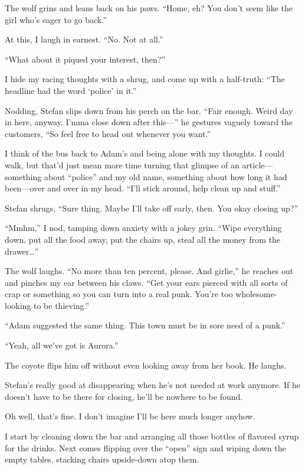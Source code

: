 The wolf grins and leans back on his paws. ``Home, eh? You don't seem like the girl who's eager to go back.''

At this, I laugh in earnest. ``No. Not at all.''

``What about it piqued your interest, then?''

I hide my racing thoughts with a shrug, and come up with a half-truth: ``The headline had the word `police' in it.''

Nodding, Stefan slips down from his perch on the bar. ``Fair enough. Weird day in here, anyway. I'mma close down after this---'' he gestures vaguely toward the customers, ``So feel free to head out whenever you want.''

I think of the bus back to Adam's and being alone with my thoughts. I could walk, but that'd just mean more time turning that glimpse of an article---something about ``police'' and my old name, something about how long it had been---over and over in my head. ``I'll stick around, help clean up and stuff.''

Stefan shrugs, ``Sure thing. Maybe I'll take off early, then. You okay closing up?''

``Mmhm,'' I nod, tamping down anxiety with a jokey grin. ``Wipe everything down, put all the food away, put the chairs up, steal all the money from the drawer\ldots{}''

The wolf laughs. ``No more than ten percent, please. And girlie,'' he reaches out and pinches my ear between his claws. ``Get your ears pierced with all sorts of crap or something so you can turn into a real punk. You're too wholesome-looking to be thieving.''

``Adam suggested the same thing. This town must be in sore need of a punk.''

``Yeah, all we've got is Aurora.''

The coyote flips him off without even looking away from her book. He laughs.

\secdiv{}

\noindent Stefan's really good at disappearing when he's not needed at work anymore. If he doesn't have to be there for closing, he'll be nowhere to be found.

Oh well, that's fine. I don't imagine I'll be here much longer anyhow.

I start by cleaning down the bar and arranging all those bottles of flavored syrup for the drinks. Next comes flipping over the ``open'' sign and wiping down the empty tables, stacking chairs upside-down atop them.

